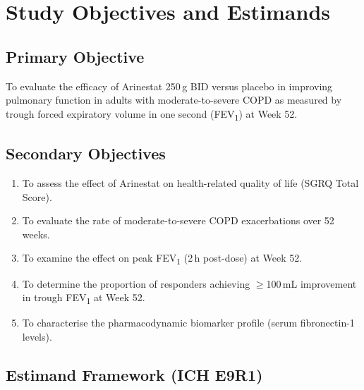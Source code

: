 \documentclass[11pt,a4paper]{article}
\begin{document}
\clearpage

\section{Study Objectives and Estimands}

\subsection{Primary Objective}

To evaluate the efficacy of Arinestat 250\,\textmu g BID versus placebo in improving
pulmonary function in adults with moderate-to-severe COPD as measured by trough
forced expiratory volume in one second (FEV\textsubscript{1}) at Week 52.

\subsection{Secondary Objectives}

\begin{enumerate}[leftmargin=1.8em, itemsep=3pt]
  \item To assess the effect of Arinestat on health-related quality of life (SGRQ Total Score).
  \item To evaluate the rate of moderate-to-severe COPD exacerbations over 52 weeks.
  \item To examine the effect on peak FEV\textsubscript{1} (2\,h post-dose) at Week 52.
  \item To determine the proportion of responders achieving $\geq$100\,mL improvement in
        trough FEV\textsubscript{1} at Week 52.
  \item To characterise the pharmacodynamic biomarker profile (serum fibronectin-1 levels).
\end{enumerate}

\subsection{Estimand Framework (ICH E9R1)}
\end{document}
